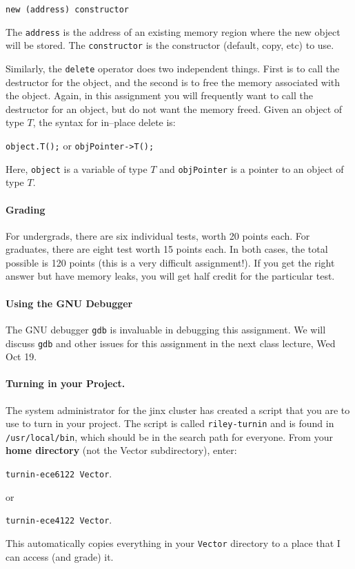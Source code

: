 \documentclass[10pt]{article}
\begin{document}
{\tt new (address) constructor}

The {\tt address} is the address of an existing memory region where
the new object will be stored.  The {\tt constructor} is the
constructor (default, copy, etc) to use.

Similarly, the {\tt delete} operator does two independent things.
First is to call the destructor for the object, and the second is to
free the memory associated with the object.  Again, in this assignment
you will frequently want to call the destructor for an object, but do not
want the memory freed.  Given an object of type $T$, the syntax for
in--place delete is:

{\tt object.T();}  or {\tt objPointer->T();}

Here, {\tt object} is a variable of type $T$ and {\tt objPointer}
is a pointer to an object of type $T$.


\paragraph{Grading}
For undergrads, there are six individual tests, worth 20 points each.
For graduates, there are eight test worth 15 points each. In both 
cases, the total possible is 120 points (this is a very difficult
assignment!).  If you get the right answer but have memory leaks, you
will get half credit for the particular test.

\paragraph{Using the GNU Debugger}
The GNU debugger {\tt gdb} is invaluable in debugging this assignment.
We will discuss {\tt gdb} and other issues for this assignment in the
next class lecture, Wed Oct 19.

\paragraph{Turning in your Project.}
The system administrator for the jinx cluster has created a script
that you are to use to turn in  your project.  The script is called
{\tt riley-turnin} and is found in {\tt /usr/local/bin}, which should
be in the search path for everyone.  From your {\bf home directory}
(not the Vector subdirectory), enter:
\par
{\tt turnin-ece6122 Vector}.

or

{\tt turnin-ece4122 Vector}.

\par
This automatically copies everything in your {\tt Vector}
directory to a place that I can access (and grade) it.
\end{document}
